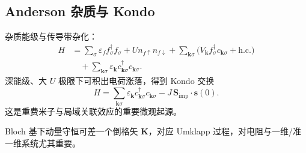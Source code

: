 \subsection{Anderson 杂质与 Kondo}

杂质能级与传导带杂化：
\begin{equation}
\begin{aligned}
  H
  &=\sum_\sigma\varepsilon_f f_\sigma^\dagger f_\sigma
  +U n_{f\uparrow}n_{f\downarrow}
  +\sum_{\mathbf{k}\sigma}
  \bigl(V_{\mathbf{k}}f_\sigma^\dagger c_{\mathbf{k}\sigma}+\mathrm{h.c.}\bigr)\\
  &\quad+\sum_{\mathbf{k}\sigma}\varepsilon_{\mathbf{k}}
  c_{\mathbf{k}\sigma}^\dagger c_{\mathbf{k}\sigma}.
\end{aligned}
\end{equation}
深能级、大 $U$ 极限下可积出电荷涨落，得到 Kondo 交换
\begin{equation}
  H=\sum_{\mathbf{k}\sigma}\varepsilon_{\mathbf{k}}
  c_{\mathbf{k}\sigma}^\dagger c_{\mathbf{k}\sigma}
  -J\,\mathbf{S}_{\mathrm{imp}}\cdot\mathbf{s}(0).
\end{equation}
这是重费米子与局域关联效应的重要微观起源。

\begin{note}
Bloch 基下动量守恒可差一个倒格矢 $\mathbf{K}$，对应 Umklapp 过程，对电阻与一维/准一维系统尤其重要。
\end{note}
